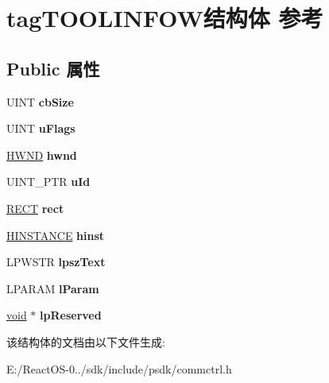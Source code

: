 \hypertarget{structtag_t_o_o_l_i_n_f_o_w}{}\section{tag\+T\+O\+O\+L\+I\+N\+F\+O\+W结构体 参考}
\label{structtag_t_o_o_l_i_n_f_o_w}
\subsection*{Public 属性}
\begin{DoxyCompactItemize}
\item 
\mbox{\label{structtag_t_o_o_l_i_n_f_o_w_af51642e7d70ab6ea151fdecac2ada032}} 
U\+I\+NT {\bfseries cb\+Size}
\item 
\mbox{\label{structtag_t_o_o_l_i_n_f_o_w_a8a33959090a68653e2815581ec21a437}} 
U\+I\+NT {\bfseries u\+Flags}
\item 
\mbox{\label{structtag_t_o_o_l_i_n_f_o_w_a34b2268f1c0d38267051ff21d57fa06d}} 
\hyperlink{interfacevoid}{H\+W\+ND} {\bfseries hwnd}
\item 
\mbox{\label{structtag_t_o_o_l_i_n_f_o_w_a46f7d959ad3c4c7163adb40fa830f316}} 
U\+I\+N\+T\+\_\+\+P\+TR {\bfseries u\+Id}
\item 
\mbox{\label{structtag_t_o_o_l_i_n_f_o_w_a99c5277d9f1c9e4168b7db10e23b6c14}} 
\hyperlink{structtag_r_e_c_t}{R\+E\+CT} {\bfseries rect}
\item 
\mbox{\label{structtag_t_o_o_l_i_n_f_o_w_a1824f5eb55a055ac648de22223130f51}} 
\hyperlink{interfacevoid}{H\+I\+N\+S\+T\+A\+N\+CE} {\bfseries hinst}
\item 
\mbox{\label{structtag_t_o_o_l_i_n_f_o_w_a59e22d3dea6c61f1fd3df8d4d4d8466f}} 
L\+P\+W\+S\+TR {\bfseries lpsz\+Text}
\item 
\mbox{\label{structtag_t_o_o_l_i_n_f_o_w_a51814d7ae85c7893d5248f7da6a42ebe}} 
L\+P\+A\+R\+AM {\bfseries l\+Param}
\item 
\mbox{\label{structtag_t_o_o_l_i_n_f_o_w_ab3ec9df18d811235e92b2d18a7483166}} 
\hyperlink{interfacevoid}{void} $\ast$ {\bfseries lp\+Reserved}
\end{DoxyCompactItemize}


该结构体的文档由以下文件生成\+:\begin{DoxyCompactItemize}
\item 
E\+:/\+React\+O\+S-\/0../sdk/include/psdk/commctrl.\+h\end{DoxyCompactItemize}
